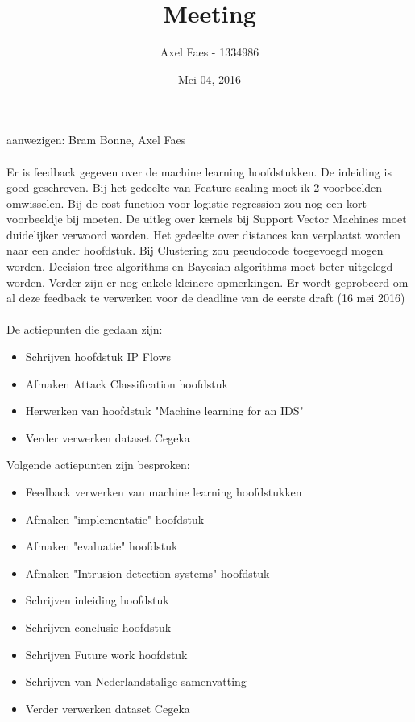 \documentclass[notitlepage]{article}
\title{Meeting}
\author{Axel Faes - 1334986}
\date{Mei 04, 2016}
\begin{document}
\maketitle

aanwezigen: Bram Bonne, Axel Faes \\
\\
Er is feedback gegeven over de machine learning hoofdstukken. De inleiding is goed geschreven. Bij het gedeelte van Feature scaling moet ik 2 voorbeelden omwisselen. Bij de cost function voor logistic regression zou nog een kort voorbeeldje bij moeten. De uitleg over kernels bij Support Vector Machines moet duidelijker verwoord worden. Het gedeelte over distances kan verplaatst worden naar een ander hoofdstuk. Bij Clustering zou pseudocode toegevoegd mogen worden. Decision tree algorithms en Bayesian algorithms moet beter uitgelegd worden. Verder zijn er nog enkele kleinere opmerkingen. Er wordt geprobeerd om al deze feedback te verwerken voor de deadline van de eerste draft (16 mei 2016)\\
\\
De actiepunten die gedaan zijn:
\begin{itemize}  
		\item Schrijven hoofdstuk IP Flows
		\item Afmaken Attack Classification hoofdstuk
		\item Herwerken van hoofdstuk "Machine learning for an IDS"
        \item Verder verwerken dataset Cegeka
\end{itemize}

Volgende actiepunten zijn besproken:
\begin{itemize}  		
		\item Feedback verwerken van machine learning hoofdstukken
		\item Afmaken "implementatie" hoofdstuk
		\item Afmaken "evaluatie" hoofdstuk
		\item Afmaken "Intrusion detection systems" hoofdstuk
		\item Schrijven inleiding hoofdstuk
		\item Schrijven conclusie hoofdstuk
		\item Schrijven Future work hoofdstuk
		\item Schrijven van Nederlandstalige samenvatting
        \item Verder verwerken dataset Cegeka
\end{itemize}
\end{document}
